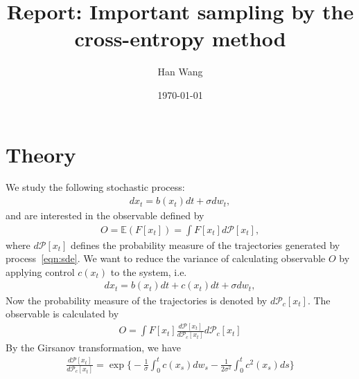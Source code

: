 \documentclass[aip,jcp,a4paper,reprint,onecolumn]{revtex4-1}
\newcommand{\pathmeas}{d\mathcal P}
\begin{document}
\title{Report: Important sampling by the cross-entropy method}
\author{Han Wang}

\date{\today}

\begin{abstract}
\end{abstract}

\maketitle

\section{Theory}
We study the following stochastic process:
\begin{align}\label{eqn:sde}
  dx_t = b(x_t) dt + \sigma dw_t,
\end{align}
and are interested in the observable defined by
\begin{align}
  O = \mathbb E(F[x_t]) = \int F[x_t] \pathmeas[x_t],
\end{align}
where $\pathmeas[x_t]$ defines the probability measure of the
trajectories generated by process~\eqref{eqn:sde}.  We want to reduce
the variance of calculating observable $O$ by applying control
$c(x_t)$ to the system, i.e.
\begin{align}
  dx_t = b(x_t) dt + c(x_t) dt + \sigma dw_t,  
\end{align}
Now the probability measure of the trajectories is denoted by
$\pathmeas_c[x_t]$. The observable is calculated by
\begin{align}
  O = \int F[x_t] \frac{\pathmeas[x_t]}{\pathmeas_c[x_t]} \pathmeas_c[x_t]
\end{align}
By the Girsanov transformation, we have
\begin{align}
  \frac{\pathmeas[x_t]}{\pathmeas_c[x_t]} = 
  \exp \Big\{ - \frac 1\sigma \int_0^t c(x_s) dw_s - \frac1{2\sigma^2} \int_0^t c^2(x_s) ds\Big\}
\end{align}\\
\end{document}
